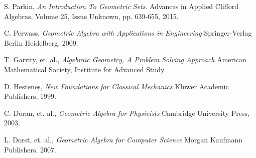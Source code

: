 \documentclass{birkjour}
\theoremstyle{definition}
\theoremstyle{remark}
\numberwithin{equation}{section}
\begin{document}
\begin{thebibliography}{9}

S. Parkin,
\emph{An Introduction To Geometric Sets}.
Advances in Applied Clifford Algebras, Volume 25, Issue Unknown, pp. 639-655, 2015.

C. Perwass,
\emph{Geometric Algebra with Applications in Engineering}
Springer-Verlag Berlin Heidelberg, 2009.

T. Garrity, et. al.,
\emph{Algebraic Geometry, A Problem Solving Approach}
American Mathematical Society, Institute for Advanced Study

D. Hestenes,
\emph{New Foundations for Classical Mechanics}
Kluwer Academic Publishers, 1999.

C. Doran, et. al.,
\emph{Geometric Algebra for Physicists}
Cambridge University Press, 2003.

L. Dorst, et. al.,
\emph{Geometric Algebra for Computer Science}
Morgan Kaufmann Publishers, 2007.

\end{thebibliography}
\end{document}
